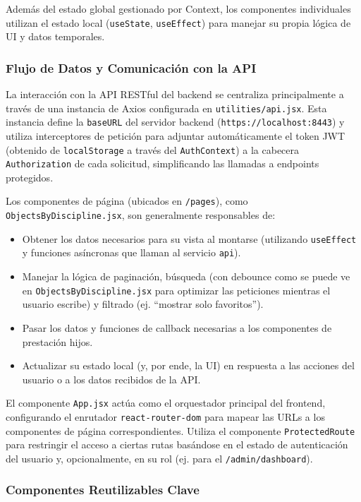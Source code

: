 Además del estado global gestionado por Context, los componentes individuales utilizan el estado local (\texttt{useState}, \texttt{useEffect}) para manejar su propia lógica de UI y datos temporales.

\subsubsection{Flujo de Datos y Comunicación con la API}
\label{sssec:frontendFlujoDatosApi}

La interacción con la API RESTful del backend se centraliza principalmente a través de una instancia de Axios configurada en \texttt{utilities/api.jsx}. Esta instancia define la \texttt{baseURL} del servidor backend (\texttt{https://localhost:8443}) y utiliza interceptores de petición para adjuntar automáticamente el token JWT (obtenido de \texttt{localStorage} a través del \texttt{AuthContext}) a la cabecera \texttt{Authorization} de cada solicitud, simplificando las llamadas a endpoints protegidos.

Los componentes de página (ubicados en \texttt{/pages}), como \texttt{ObjectsByDiscipline.jsx}, son generalmente responsables de:
\begin{itemize}
    \item Obtener los datos necesarios para su vista al montarse (utilizando \texttt{useEffect} y funciones asíncronas que llaman al servicio \texttt{api}).
    \item Manejar la lógica de paginación, búsqueda (con debounce como se puede ve en \texttt{ObjectsByDiscipline.jsx} para optimizar las peticiones mientras el usuario escribe) y filtrado (ej. ``mostrar solo favoritos'').
    \item Pasar los datos y funciones de callback necesarias a los componentes de prestación hijos.
    \item Actualizar su estado local (y, por ende, la UI) en respuesta a las acciones del usuario o a los datos recibidos de la API.
\end{itemize}
El componente \texttt{App.jsx} actúa como el orquestador principal del frontend, configurando el enrutador \texttt{react-router-dom} para mapear las URLs a los componentes de página correspondientes. Utiliza el componente \texttt{ProtectedRoute} para restringir el acceso a ciertas rutas basándose en el estado de autenticación del usuario y, opcionalmente, en su rol (ej. para el \texttt{/admin/dashboard}).

\subsubsection{Componentes Reutilizables Clave}
\label{sssec:frontendComponentesReutilizables}

